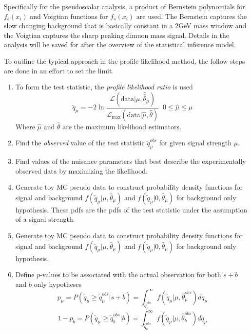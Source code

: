 Specifically for the pseudoscalar analysis, a product of Bernstein polynomials for $f_b(x_i)$ and Voigtian functions for $f_s(x_i)$ are used. The Bernstein captures the slow changing background that is basically constant in a 2GeV mass window and the Voigtian captures the sharp peaking dimuon mass signal. Details in the analysis will be saved for after the overview of the statistical inference model. 

To outline the typical approach in the profile likelihood method, the follow steps are done in an effort to set the limit
\begin{enumerate}
\item {To form the test statistic, the \textit{profile likelihood ratio} is used 
  \begin{equation}\tilde{q}_\mu = -2 \ln \frac{\mathcal{L}(\text{data}|\mu,\hat{\hat{\theta}}_\mu)}{\mathcal{L}_\text{max}(\text{data}|\hat{\mu},\hat{\theta})} \;\; 0\leq \hat{\mu} \leq \mu \end{equation}
  Where $\hat{\mu}$ and $\hat{\theta}$ are the maximum likelihood estimators. 
  }
  \item Find the \textit{observed} value of the test statistic $\tilde{q}_\mu^{obs}$ for given signal strength $\mu$.
  \item Find values of the nuisance parameters that best describe the experimentally observed data by maximizing the likelihood.
  \item Generate toy MC pseudo data to construct probability density functions for signal and background $f(\tilde{q}_\mu|\mu,\hat{\theta}_\mu)$ and $f(\tilde{q}_\mu|0,\hat{\theta}_\mu)$ for background only hypothesis. These pdfs are the pdfs of the test statistic under the assumption of a signal strength.
  \item Generate toy MC pseudo data to construct probability density functions for signal and background $f(\tilde{q}_\mu|\mu,\hat{\theta}_\mu)$ and $f(\tilde{q}_\mu|0,\hat{\theta}_\mu)$ for background only hypothesis.
  \item {Define $p$-values to be associated with the actual observation for both $s+b$ and $b$ only hypotheses
  \begin{equation} p_\mu = P(\tilde{q}_\mu \ge \tilde{q}_\mu^{obs}| s+b) = \int_{\tilde{q}_\mu^{obs}}^\infty f(\tilde{q}_\mu |\mu,\hat{\theta}_\mu^{obs} ) d\tilde{q}_\mu\end{equation}
  \begin{equation} 1- p_b = P(\tilde{q}_\mu \ge \tilde{q}_b^{obs}| b) = \int_{\tilde{q}_b^{obs}}^\infty f(\tilde{q}_\mu |\mu,\hat{\theta}_b^{obs} ) d\tilde{q}_\mu\end{equation}
}
\end{enumerate}

